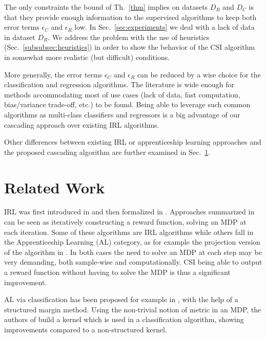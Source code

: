 \documentclass{llncs}
\begin{document}
The only constraints the bound of Th.~\ref{thm} implies on datasets $D_R$ and $D_C$ is that they provide enough information to the supervised algorithms to keep both error terms $\epsilon_C$ and $\epsilon_R$ low. In Sec.~\ref{sec:experiments} we deal with a lack of data in dataset $D_R$. We address the problem with the use of heuristics (Sec.~\ref{subsubsec:heuristics}) in order to show the behavior of the CSI algorithm in somewhat more realistic (but difficult) conditions.

More generally, the error terms  $\epsilon_C$ and $\epsilon_R$ can be reduced by a wise choice for the classification and regression algorithms. The literature is wide enough for methods accommodating most of use cases (lack of data, fast computation, bias/variance trade-off, etc.) to be found. Being able to leverage such common algorithms as multi-class classifiers and regressors is a big advantage of our cascading approach over existing IRL algorithms.

Other differences between existing IRL or apprenticeship learning approaches and the proposed cascading algorithm are further examined in Sec.~\ref{sec:related}.


\section{Related Work}
\label{sec:related}
IRL was first introduced in \cite{russell1998learning} and then formalized in \cite{ng2000algorithms}. Approaches summarized in \cite{neu2009training} can be seen as iteratively constructing a reward function, solving an MDP at each iteration. Some of these algorithms are IRL algorithms while others fall in the Apprenticeship Learning (AL) category, as for example the projection version of the algorithm in \cite{abbeel2004apprenticeship}. In both cases the need to solve an MDP at each step may be very demanding, both sample-wise and computationally. CSI being able to output a reward function without having to solve the MDP is thus a significant improvement.

AL via classification has been proposed for example in \cite{ratliff2007imitation}, with the help of a structured margin method. Using the non-trivial notion of metric in an MDP, the authors of \cite{melo2010learning} build a kernel which is used
in a classification algorithm, showing improvements compared to a
non-structured kernel.
\end{document}

